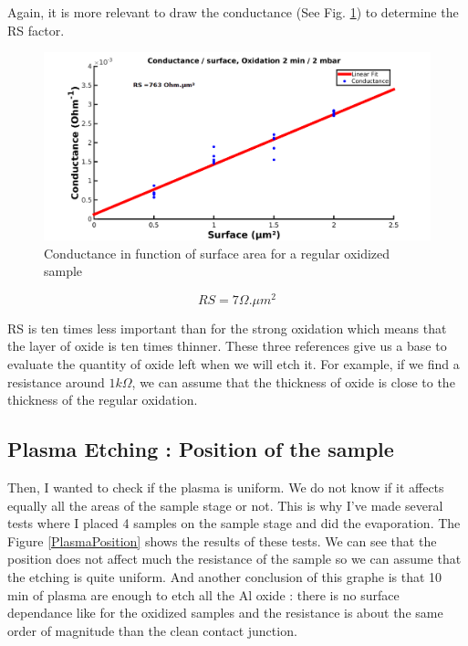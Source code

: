                 Again, it is more relevant to draw the conductance (See Fig. \ref{Regularox}) to determine the RS factor.
                
                \begin{figure}
                    \centering
                    \includegraphics[width=12cm]{ConductanceFitOx.png}
                    \caption{Conductance in function of surface area for a regular oxidized sample}
                    \label{Regularox}
                \end{figure}
                                
                \[RS=7\Omega.\mu m^2\]
                
                RS is ten times less important than for the strong oxidation which means that the layer of oxide is ten times thinner.
                These three references give us a base to evaluate the quantity of oxide left when we will etch it. For example, if we find a resistance around $1k\Omega$, we can assume that the thickness of oxide is close to the thickness of the regular oxidation.
                                
                \subsection{Plasma Etching : Position of the sample}
                
                Then, I wanted to check if the plasma is uniform. We do not know if it affects equally all the areas of the sample stage or not. This is why I've made several tests where I placed 4 samples on the sample stage and did the evaporation. The Figure \ref{PlasmaPosition} shows the results of these tests. We can see that the position does not affect much the resistance of the sample so we can assume that the etching is quite uniform. And another conclusion of this graphe is that 10 min of plasma are enough to etch all the Al oxide : there is no surface dependance like for the oxidized samples and the resistance is about the same order of magnitude than the clean contact junction.
                

